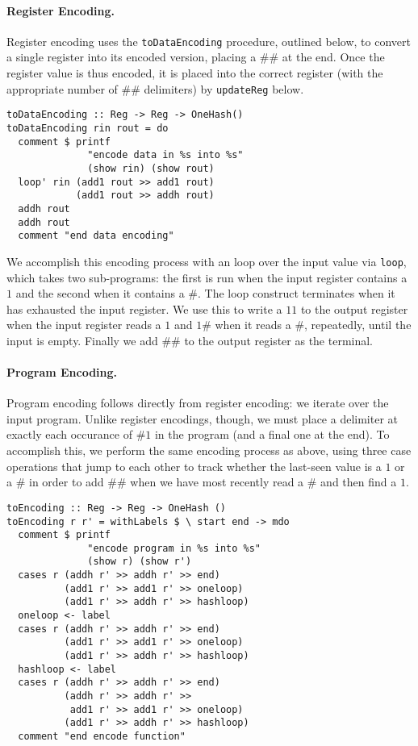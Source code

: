 \documentclass[10pt, preprint, nocopyrightspace]{sigplanconf}
\begin{document}
\paragraph{Register Encoding.}

Register encoding uses the \lstinline{toDataEncoding} procedure, outlined below,
to convert a single register into its encoded version, placing a $\#\#$ at the
end. Once the register value is thus encoded, it is placed into the correct
register (with the appropriate number of $\#\#$ delimiters) by
\lstinline{updateReg} below. 

\begin{lstlisting}
toDataEncoding :: Reg -> Reg -> OneHash()
toDataEncoding rin rout = do
  comment $ printf
              "encode data in %s into %s"
              (show rin) (show rout)
  loop' rin (add1 rout >> add1 rout)
            (add1 rout >> addh rout)
  addh rout
  addh rout
  comment "end data encoding"
\end{lstlisting}

We accomplish this encoding process with an loop over the input value via
\lstinline{loop}, which takes two sub-programs: the first is run when the input
register contains a $1$ and the second when it contains a $\#$. The loop
construct terminates when it has exhausted the input register.  We use this to
write a $11$ to the output register when the input register reads a $1$ and
$1\#$ when it reads a $\#$, repeatedly, until the input is empty.  Finally we
add $\#\#$ to the output register as the terminal.

\paragraph{Program Encoding.}

Program encoding follows directly from register encoding: we iterate over the
input program. Unlike register encodings, though, we must place a delimiter
at exactly each occurance of $\#1$ in the program (and a final one at the end).
To accomplish this, we perform the same encoding process as above, using three
case operations that jump to each other to track whether the last-seen value
is a $1$ or a $\#$ in order to add $\#\#$ when we have most recently read a $\#$
and then find a $1$.

\begin{lstlisting}
toEncoding :: Reg -> Reg -> OneHash ()
toEncoding r r' = withLabels $ \ start end -> mdo
  comment $ printf
              "encode program in %s into %s"
              (show r) (show r')
  cases r (addh r' >> addh r' >> end)
          (add1 r' >> add1 r' >> oneloop)
          (add1 r' >> addh r' >> hashloop)
  oneloop <- label
  cases r (addh r' >> addh r' >> end)
          (add1 r' >> add1 r' >> oneloop)
          (add1 r' >> addh r' >> hashloop)
  hashloop <- label
  cases r (addh r' >> addh r' >> end)
          (addh r' >> addh r' >>
           add1 r' >> add1 r' >> oneloop)
          (add1 r' >> addh r' >> hashloop)
  comment "end encode function"
\end{lstlisting}
\end{document}
